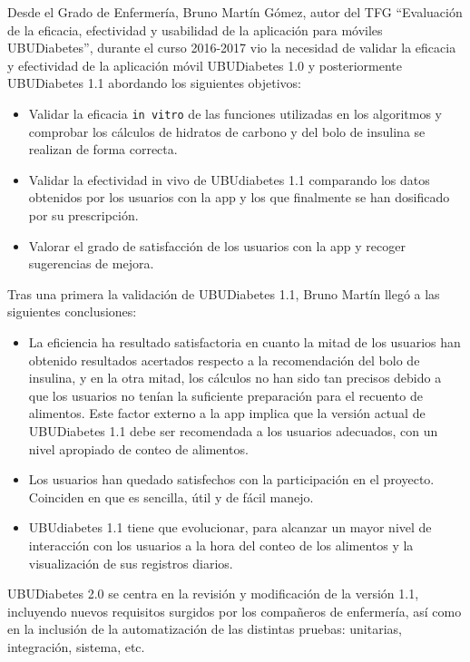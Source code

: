 Desde el Grado de Enfermería, Bruno Martín Gómez, autor del TFG ``Evaluación de la eficacia, efectividad y usabilidad de la aplicación para móviles UBUDiabetes'', durante el curso 2016-2017 vio la necesidad de validar la eficacia y efectividad de la aplicación móvil UBUDiabetes 1.0 y posteriormente UBUDiabetes 1.1 abordando los siguientes objetivos\cite{bruno2017}:
\begin{itemize}
	\item Validar la eficacia \texttt{in vitro} de las funciones utilizadas en los algoritmos y comprobar los cálculos de hidratos de carbono y del bolo de insulina se realizan de forma correcta.
	\item Validar la efectividad in vivo de UBUdiabetes 1.1 comparando los datos obtenidos por los usuarios con la app y los que finalmente se han dosificado por su prescripción.
	\item Valorar el grado de satisfacción de los usuarios con la app y recoger sugerencias de mejora.
\end{itemize}
Tras una primera la validación de UBUDiabetes 1.1, Bruno Martín llegó a las siguientes conclusiones\cite{bruno2017}:
\begin{itemize}
	\item La eficiencia ha resultado satisfactoria en cuanto la mitad de los usuarios han obtenido resultados acertados respecto a la recomendación del bolo de insulina, y en la otra mitad, los cálculos no han sido tan precisos debido a que los usuarios no tenían la suficiente preparación para el recuento de alimentos. Este factor externo a la app implica que la versión actual de UBUDiabetes 1.1 debe ser recomendada a los usuarios adecuados, con un nivel apropiado de conteo de alimentos.
	\item Los usuarios han quedado satisfechos con la participación en el proyecto. Coinciden en que es sencilla, útil y de fácil manejo.
	\item UBUdiabetes 1.1 tiene que evolucionar, para alcanzar un mayor nivel de interacción con los usuarios a la hora del conteo de los alimentos y la visualización de sus registros diarios.
\end{itemize}

UBUDiabetes 2.0 se centra en la revisión y modificación de la versión 1.1, incluyendo nuevos requisitos surgidos por los compañeros de enfermería, así como en la inclusión de la automatización de las distintas pruebas: unitarias, integración, sistema, etc. 